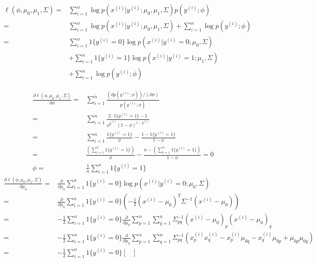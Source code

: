 \begin{answer}
\begin{align*}
    \ell(\phi, \mu_{0}, \mu_{1}, \Sigma) =& \sum_{i=1}^n \log p(x^{(i)} | y^{(i)}; \mu_{0}, \mu_{1}, \Sigma) p(y^{(i)}; \phi) \\
    =& \sum_{i=1}^n \log p(x^{(i)} | y^{(i)}; \mu_{0}, \mu_{1}, \Sigma) + \sum_{i=1}^n \log p(y^{(i)}; \phi) \\
    =& \sum_{i=1}^n 1\{y^{(i)}=0\}\log p(x^{(i)} | y^{(i)}=0; \mu_{0}, \Sigma) \\
    &+ \sum_{i=1}^n 1\{y^{(i)}=1\}\log p(x^{(i)} | y^{(i)}=1; \mu_{1}, \Sigma) \\
    &+ \sum_{i=1}^n \log p(y^{(i)}; \phi)
\end{align*}
    
\begin{align*}
    \frac{\partial\ell(\phi, \mu_{0}, \mu_{1}, \Sigma)}{\partial\phi} =& \sum_{i=1}^n \frac{(\partial p(y^{(i)}; \phi))/(\partial\phi)}{p(y^{(i)}; \phi)} \\
    =& \sum_{i=1}^n \frac{2\cdot 1\{y^{(i)}=1\} - 1}{\phi^{y^{(i)}}(1-\phi)^{1-y^{(i)}}} \\
    =& \sum_{i=1}^n \frac{1\{y^{(i)}=1\}}{\phi} - \frac{1 - 1\{y^{(i)}=1\}}{1-\phi} \\
    =& \frac{\left(\sum_{i=1}^n 1\{y^{(i)}=1\}\right)}{\phi} - \frac{n - \left(\sum_{i=1}^n 1\{y^{(i)}=1\}\right)}{1-\phi} = 0 \\
    \phi =& \frac{1}{n} \sum_{i=1}^n 1\{y^{(i)}=1\}
\end{align*}
\begin{align*}
    \frac{\partial\ell(\phi, \mu_{0}, \mu_{1}, \Sigma)}{\partial\mu_{0}} =& \frac{\partial}{\partial\mu_{0}} \sum_{i=1}^n 1\{y^{(i)}=0\}\log p(x^{(i)} | y^{(i)}=0; \mu_{0}, \Sigma) \\
    =& \frac{\partial}{\partial\mu_{0}} \sum_{i=1}^n 1\{y^{(i)}=0\} \left(-\frac{1}{2}(x^{(i)}-\mu_{0})^T\Sigma^{-1}(x^{(i)}-\mu_{0})\right) \\
    =& -\frac{1}{2}\sum_{i=1}^n 1\{y^{(i)}=0\} \frac{\partial}{\partial\mu_{0}} 
    \sum_{p=1}^n \sum_{q=1}^n \Sigma^{-1}_{pq} (x^{(i)}-\mu_{0})_p (x^{(i)}-\mu_{0})_q \\
    =& -\frac{1}{2}\sum_{i=1}^n 1\{y^{(i)}=0\} \frac{\partial}{\partial\mu_{0}} 
    \sum_{p=1}^n \sum_{q=1}^n \Sigma^{-1}_{pq} (x^{(i)}_p x^{(i)}_q - x^{(i)}_p\mu_{0q} - x^{(i)}_q\mu_{0p} + \mu_{0p}\mu_{0q}) \\
    =& -\frac{1}{2}\sum_{i=1}^n 1\{y^{(i)}=0\} 
    \begin{bmatrix}

\end{bmatrix}
\end{align*}
\end{answer}

